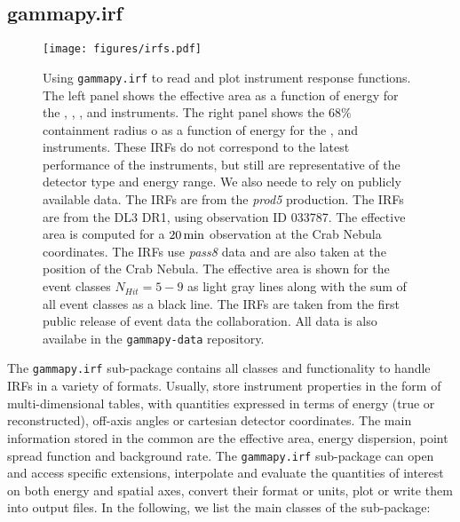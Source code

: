 \documentclass[traditabstract, longauth]{aa}
\newcommand{\code}[1]{\texttt{#1}}
\begin{document}
\subsection{gammapy.irf}
\label{ssec:gammapy-irf}
%
%
\begin{figure*}[ht!]
	\centering
	\texttt{[image: figures/irfs.pdf]}
	\caption{
		Using \code{gammapy.irf} to read and plot instrument response functions.
		The left panel shows the effective area as a function of energy for
		the \cta, \hess, \magic, \hawc and \fermi instruments. The right panel shows
		the $68\%$ containment radius o as a function of energy for the \cta, \hess
		and \fermi instruments. These IRFs do not correspond to the latest
		performance of the instruments, but still are representative of the 
		detector type and energy range. We also neede to rely on publicly available
		data. The \cta IRFs are from the \textit{prod5} production. The \hess IRFs are from the DL3 DR1,
        using observation ID 033787. The \magic effective area is computed for a
        $20\,{\rm min}$ observation at the Crab Nebula coordinates. The
		\fermi IRFs use \textit{pass8} data and are also taken at the position of the Crab Nebula.
		The \hawc effective area is shown for the event classes $N_{Hit}=5 - 9$ as light gray
		lines along with the sum of all event classes as a black line. The \hawc IRFs are taken from
		the first public release of event data the \hawc collaboration. All 
		data is also availabe in the \code{gammapy-data} repository.
    }
	\label{fig:irfs}
\end{figure*}
%

The \code{gammapy.irf} sub-package contains all classes and functionality
to handle IRFs in a variety of formats.
Usually, \irfs store instrument properties in the form of multi-dimensional
tables, with quantities expressed in terms of energy (true or reconstructed),
off-axis angles or cartesian detector coordinates. The main information stored in
the common \gammaray \irfs are the effective area, energy dispersion,
point spread function and background rate. The \code{gammapy.irf}
sub-package can open and access specific \irf extensions,
interpolate and evaluate the quantities of interest on both energy and spatial
axes, convert their format or units, plot or write them into
output files. In the following, we list the main classes of the
sub-package:
\end{document}
